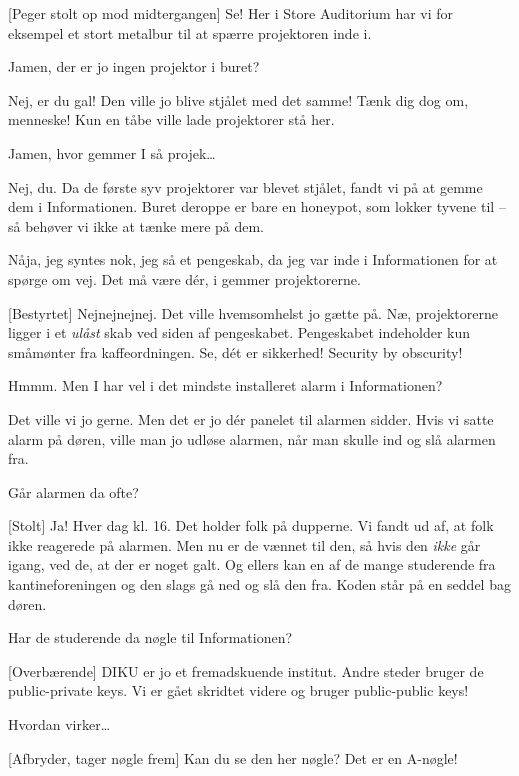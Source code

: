 \documentclass[a4paper,11pt]{article}
\begin{document}
\begin{sketch}

[Peger stolt op mod midtergangen] Se! Her i Store Auditorium har vi for
eksempel et stort metalbur til at spærre projektoren inde i. 

 Jamen, der er jo ingen projektor i buret?

 Nej, er du gal! Den ville jo blive stjålet med det samme! Tænk dig
dog om, menneske! Kun en tåbe ville lade projektorer stå her.

 Jamen, hvor gemmer I så projek\ldots

 Nej, du. Da de første syv projektorer var blevet stjålet, fandt vi
på at gemme dem i Informationen. Buret deroppe er bare en honeypot, som lokker
tyvene til -- så behøver vi ikke at tænke mere på dem.

 Nåja, jeg syntes nok, jeg så et pengeskab, da jeg var inde i
Informationen for at spørge om vej. Det må være dér, i gemmer projektorerne.

[Bestyrtet] Nejnejnejnej. Det ville hvemsomhelst jo gætte på. Næ,
projektorerne ligger i et \emph{ulåst} skab ved siden af
pengeskabet. Pengeskabet indeholder kun småmønter fra kaffeordningen. Se, dét
er sikkerhed! 
Security by obscurity!

 Hmmm. Men I har vel i det mindste installeret alarm i Informationen?

 Det ville vi jo gerne. Men det er jo dér panelet til alarmen
sidder. Hvis vi satte alarm på døren, ville man jo udløse alarmen, når man
skulle ind og slå alarmen fra.

 Går alarmen da ofte?

[Stolt] Ja! Hver dag kl. 16. Det holder folk på dupperne. Vi fandt ud
af, at folk ikke reagerede på alarmen. Men nu er de vænnet til den, så hvis
den \emph{ikke} går igang, ved de, at der er noget galt. Og ellers kan en af
  de mange studerende fra kantineforeningen og den slags gå ned og slå den
  fra. Koden står på en seddel bag døren.

 Har de studerende da nøgle til Informationen?

[Overbærende] DIKU er jo et fremadskuende institut. Andre steder
bruger de public-private keys. Vi er gået skridtet videre og bruger
public-public keys!

 Hvordan virker\ldots

[Afbryder, tager nøgle frem] Kan du se den her nøgle? Det er en
A-nøgle!


\end{sketch}
\end{document}
